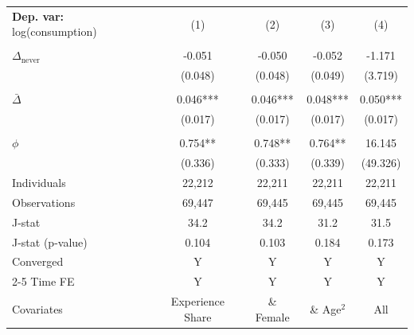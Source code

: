 \begin{tabular}{l cccc} \toprule  \textbf{Dep. var:}  log(consumption) 
                    &\multicolumn{1}{c}{(1)}   &\multicolumn{1}{c}{(2)}   &\multicolumn{1}{c}{(3)}   &\multicolumn{1}{c}{(4)}   \\
                    &               &               &               &               \\
\addlinespace
$\Delta_{\text{never}}$&      -0.051   &      -0.050   &      -0.052   &      -1.171   \\
                    &     (0.048)   &     (0.048)   &     (0.049)   &     (3.719)   \\
                    &               &               &               &               \\
\addlinespace
$\bar{\Delta}$      &       0.046***&       0.046***&       0.048***&       0.050***\\
                    &     (0.017)   &     (0.017)   &     (0.017)   &     (0.017)   \\
                    &               &               &               &               \\
\addlinespace
$\phi$              &       0.754** &       0.748** &       0.764** &      16.145   \\
                    &     (0.336)   &     (0.333)   &     (0.339)   &    (49.326)   \\
\addlinespace
Individuals         &      22,212   &      22,211   &      22,211   &      22,211   \\
Observations        &      69,447   &      69,445   &      69,445   &      69,445   \\
J-stat              &        34.2   &        34.2   &        31.2   &        31.5   \\
J-stat (p-value)    &       0.104   &       0.103   &       0.184   &       0.173   \\
Converged           &           Y   &           Y   &           Y   &           Y   \\
\cmidrule{2-5} Time FE & Y & Y & Y & Y \\ Covariates & Experience Share & \& Female & \& Age$^2$ & All \\ \bottomrule \end{tabular}
